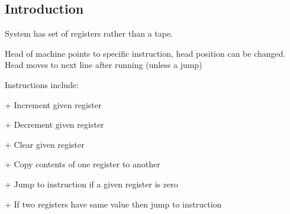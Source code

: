 
\subsection{Introduction}

System has set of registers rather than a tape.

Head of machine points to specific instruction, head position can be changed.
Head moves to next line after running (unless a jump)

Instructions include:

+ Increment given register

+ Decrement given register

+ Clear given register

+ Copy contents of one register to another

+ Jump to instruction if a given register is zero

+ If two registers have same value then jump to instruction


